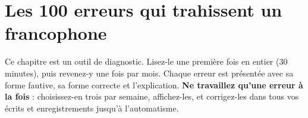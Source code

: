 \chapter{Les 100 erreurs qui trahissent un francophone}

Ce chapitre est un outil de diagnostic. Lisez-le une première fois en entier (30 minutes),
puis revenez-y une fois par mois. Chaque erreur est présentée avec sa forme fautive,
sa forme correcte et l'explication. \textbf{Ne travaillez qu'une erreur à la fois} :
choisissez-en trois par semaine, affichez-les, et corrigez-les dans tous vos écrits et
enregistrements jusqu'à l'automatisme.

